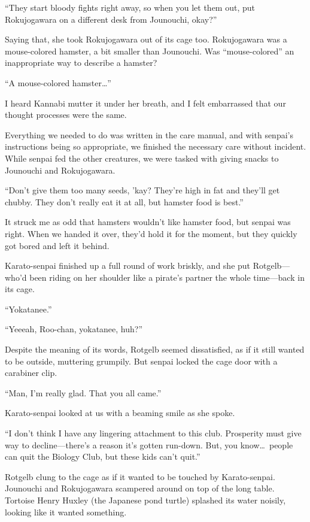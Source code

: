 \documentclass[
    a4paper,
    12pt,
    twoside,
    openany,
    UTF8,
    fontset=windows
]{ctexbook}
\begin{document}
``They start bloody fights right away, so when you let them out, put Rokujogawara on a different desk from Jounouchi, okay?''

Saying that, she took Rokujogawara out of its cage too. Rokujogawara was a mouse-colored hamster, a bit smaller than Jounouchi. Was ``mouse-colored'' an inappropriate way to describe a hamster?

``A mouse-colored hamster\dots''

I heard Kannabi mutter it under her breath, and I felt embarrassed that our thought processes were the same.

Everything we needed to do was written in the care manual, and with senpai's instructions being so appropriate, we finished the necessary care without incident. While senpai fed the other creatures, we were tasked with giving snacks to Jounouchi and Rokujogawara.

``Don't give them too many seeds, 'kay? They're high in fat and they'll get chubby. They don't really eat it at all, but hamster food is best.''

It struck me as odd that hamsters wouldn't like hamster food, but senpai was right. When we handed it over, they'd hold it for the moment, but they quickly got bored and left it behind.

Karato-senpai finished up a full round of work briskly, and she put Rotgelb---who'd been riding on her shoulder like a pirate's partner the whole time---back in its cage.

``Yokatanee.''

``Yeeeah, Roo-chan, yokatanee, huh?''

Despite the meaning of its words, Rotgelb seemed dissatisfied, as if it still wanted to be outside, muttering grumpily. But senpai locked the cage door with a carabiner clip.

``Man, I'm really glad. That you all came.''

Karato-senpai looked at us with a beaming smile as she spoke.

``I don't think I have any lingering attachment to this club. Prosperity must give way to decline---there's a reason it's gotten run-down. But, you know\dots\ people can quit the Biology Club, but these kids can't quit.''

Rotgelb clung to the cage as if it wanted to be touched by Karato-senpai. Jounouchi and Rokujogawara scampered around on top of the long table. Tortoise Henry Huxley (the Japanese pond turtle) splashed its water noisily, looking like it wanted something.
\end{document}
